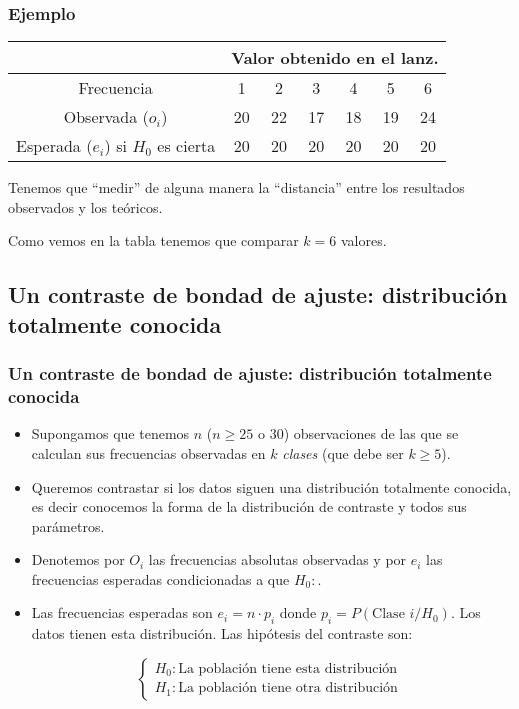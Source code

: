 \begin{frame}
\frametitle{Ejemplo}
       \begin{center}
       \begin{tabular}{|c||cccccc|}\cline{2-7}
     \multicolumn{1}{c}{} & \multicolumn{6}{|c|}{Valor obtenido en el lanz.}\\
           \hline
         Frecuencia   &1 & 2 & 3 & 4 & 5 & 6\\
           \hline
          Observada ($o_{i}$) & 20 & 22 & 17 & 18 & 19 & 24\\
          Esperada  ($e_{i}$) si $H_{0}$ es cierta& 20 & 20 & 20 & 20 & 20 & 20\\
           \hline
           \end{tabular}
       \end{center}
           Tenemos que ``medir'' de alguna manera la ``distancia''
           entre los resultados observados y los teóricos.

           Como vemos en la tabla tenemos que comparar $k= 6$ valores.
\end{frame}

\subsection{Un contraste de bondad de ajuste: distribución totalmente conocida}


\begin{frame}
\frametitle{Un contraste de bondad de ajuste: distribución totalmente conocida}
\begin{itemize}
\item Supongamos que tenemos $n$ ($n\geq 25$ o $30$) observaciones de las que se calculan sus frecuencias observadas en $k$ \emph{clases} (que debe ser $k\geq 5$).
\item  Queremos contrastar si los datos siguen una distribución totalmente conocida, es decir conocemos la forma de la distribución de contraste y todos sus parámetros.
\item  Denotemos por $O_i$ las frecuencias absolutas observadas y por $e_i$ las frecuencias esperadas condicionadas a  que $H_0:$. \item Las frecuencias esperadas son $e_i= n\cdot p_i$ donde $p_i=P(\mbox{Clase }i/H_0)$. Los datos tienen esta distribución. Las hipótesis del contraste son:

           $$\left\{\begin{array}{l}
           H_{0}: \mbox{La población tiene esta distribución }\\
           H_{1}: \mbox{La población tiene otra distribución}
           \end{array}
           \right.
           $$
\end{itemize}
\end{frame}

